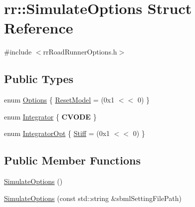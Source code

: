 \hypertarget{structrr_1_1_simulate_options}{\section{rr\-:\-:Simulate\-Options Struct Reference}
\label{structrr_1_1_simulate_options}
}


{\ttfamily \#include $<$rr\-Road\-Runner\-Options.\-h$>$}

\subsection*{Public Types}
\begin{DoxyCompactItemize}
\item 
enum \hyperlink{structrr_1_1_simulate_options_a4bc2a6d4d8f9da649e8e2a507192c8fa}{Options} \{ \hyperlink{structrr_1_1_simulate_options_a4bc2a6d4d8f9da649e8e2a507192c8faadb3441c085fef5abbd32236420ce6d71}{Reset\-Model} = (0x1 $<$$<$ 0)
 \}
\item 
enum \hyperlink{structrr_1_1_simulate_options_a9161fd2b138ff28e97491611dce61a52}{Integrator} \{ {\bfseries C\-V\-O\-D\-E}
 \}
\item 
enum \hyperlink{structrr_1_1_simulate_options_ab99045a66d2e6715020463d3bd0e30e0}{Integrator\-Opt} \{ \hyperlink{structrr_1_1_simulate_options_ab99045a66d2e6715020463d3bd0e30e0ae9161281bed7ccbcb6c9589123b371bb}{Stiff} = (0x1 $<$$<$ 0)
 \}
\end{DoxyCompactItemize}
\subsection*{Public Member Functions}
\begin{DoxyCompactItemize}
\item 
\hyperlink{structrr_1_1_simulate_options_af9d66c8fdefdb149ed56ff9b61725e35}{Simulate\-Options} ()
\item 
\hyperlink{structrr_1_1_simulate_options_a3244666e11e38f1affe43fd165b9a5e3}{Simulate\-Options} (const std\-::string \&sbml\-Setting\-File\-Path)
\end{DoxyCompactItemize}
